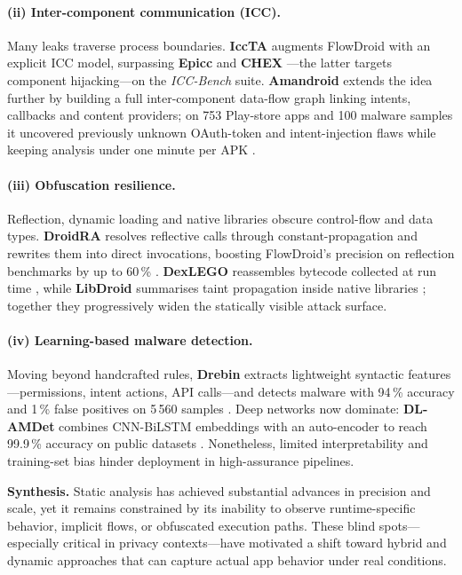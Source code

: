 \documentclass[a4paper,12pt]{report}
\begin{document}
\paragraph{(ii) Inter-component communication (ICC).}
Many leaks traverse process boundaries.  \textbf{IccTA} augments FlowDroid with an explicit ICC model, surpassing \textbf{Epicc} \cite{octeau2013epicc} and \textbf{CHEX} \cite{lu2012chex}—the latter targets component hijacking—on the \emph{ICC-Bench} suite.  \textbf{Amandroid} extends the idea further by building a full inter-component data-flow graph linking intents, callbacks and content providers; on 753 Play-store apps and 100 malware samples it uncovered previously unknown OAuth-token and intent-injection flaws while keeping analysis under one minute per APK \cite{wei2014amandroid}.

\paragraph{(iii) Obfuscation resilience.}
Reflection, dynamic loading and native libraries obscure control-flow and data types.  \textbf{DroidRA} resolves reflective calls through constant-propagation and rewrites them into direct invocations, boosting FlowDroid’s precision on reflection benchmarks by up to 60\,\% \cite{li2016droidra}.  \textbf{DexLEGO} reassembles bytecode collected at run time \cite{ning2019dexlego}, while \textbf{LibDroid} summarises taint propagation inside native libraries \cite{libdroid2022}; together they progressively widen the statically visible attack surface.

\paragraph{(iv) Learning-based malware detection.}
Moving beyond handcrafted rules, \textbf{Drebin} extracts lightweight syntactic features—permissions, intent actions, API calls—and detects malware with 94\,\% accuracy and 1\,\% false positives on 5\,560 samples \cite{arp2014drebin}.  Deep networks now dominate: \textbf{DL-AMDet} combines CNN-BiLSTM embeddings with an auto-encoder to reach 99.9\,\% accuracy on public datasets \cite{nasser2023dlamdet}.  Nonetheless, limited interpretability and training-set bias hinder deployment in high-assurance pipelines.

\medskip
\noindent\textbf{Synthesis.}
Static analysis has achieved substantial advances in precision and scale, yet it remains constrained by its inability to observe runtime-specific behavior, implicit flows, or obfuscated execution paths. These blind spots—especially critical in privacy contexts—have motivated a shift toward hybrid and dynamic approaches that can capture actual app behavior under real conditions.
\end{document}
